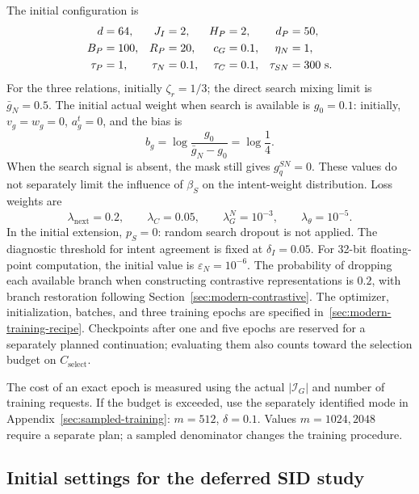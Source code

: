 \documentclass[12pt,a4paper]{article}
\newcommand{\eps}{\varepsilon}
\theoremstyle{plainru}
\begin{document}
The initial configuration is
\begin{align}
d&=64,&J_I&=2,&H_P&=2,&d_P&=50,\notag\\
B_P&=100,&R_P&=20,&c_G&=0.1,&\eta_N&=1,\notag\\
\tau_P&=1,&\tau_N&=0.1,&\tau_C&=0.1,&\tau_{SN}&=300\ \text{s}.
\label{eq:app-modern-start}
\end{align}
For the three relations, initially $\zeta_r=1/3$; the direct search
mixing limit is $\bar g_N=0.5$. The initial actual weight when search
is available is $g_0=0.1$: initially,
$v_g=w_g=0$, $a_g^t=0$, and the bias is
\begin{equation}\label{eq:app-search-init}
b_g=\log\frac{g_0}{\bar g_N-g_0}=\log\frac14.
\end{equation}
When the search signal is absent, the mask still gives
$g_q^{SN}=0$. These values do not separately limit the influence
of $\beta_S$ on the intent-weight distribution.
Loss weights are
\begin{equation}\label{eq:app-modern-loss-start}
\lambda_{\mathrm{next}}=0.2,\qquad \lambda_C=0.05,\qquad
\lambda_G^N=10^{-3},\qquad \lambda_\theta=10^{-5}.
\end{equation}
In the initial extension, $p_S=0$: random search dropout
is not applied. The diagnostic threshold for intent agreement
is fixed at $\delta_I=0.05$.
For 32-bit floating-point computation, the initial value is
$\eps_N=10^{-6}$. The probability of dropping each available branch
when constructing contrastive representations is $0.2$, with branch
restoration following Section~\ref{sec:modern-contrastive}.
The optimizer, initialization, batches, and three training epochs are specified
in~\ref{sec:modern-training-recipe}. Checkpoints after one and five epochs
are reserved for a separately planned continuation; evaluating them
also counts toward the selection budget on $C_{\mathrm{select}}$.

The cost of an exact epoch is measured using the actual $|\mathcal I_G|$
and number of training requests. If the budget is exceeded, use the separately
identified mode in Appendix~\ref{sec:sampled-training}: $m=512$,
$\delta=0.1$. Values $m=1024,2048$ require a separate plan;
a sampled denominator changes the training procedure.


\subsection{Initial settings for the deferred SID study}\label{app:sid-config}
\end{document}
